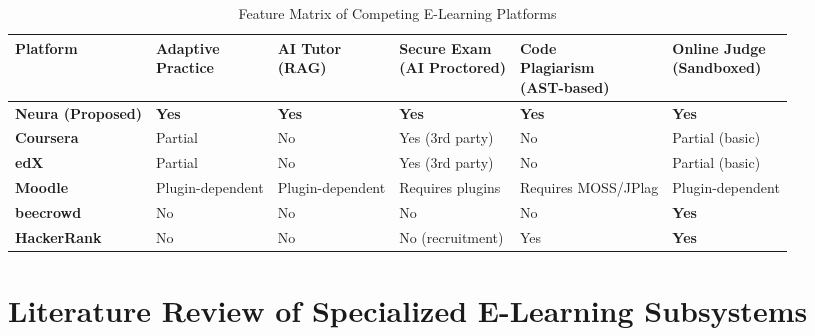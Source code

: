 \begin{table}[h]
    \centering
    \caption{Feature Matrix of Competing E-Learning Platforms}
    \label{tab:feature_matrix}
    \footnotesize
    \setlength{\tabcolsep}{6pt} %
    \begin{tabularx}{\textwidth}{@{}>{\raggedright\arraybackslash}m{2.6cm}
                                   *{5}{>{\centering\arraybackslash}X}@{}}
        \toprule
        \textbf{Platform} &
        \makecell{\textbf{Adaptive}\\\textbf{Practice}} &
        \makecell{\textbf{AI Tutor}\\\textbf{(RAG)}} &
        \makecell{\textbf{Secure Exam}\\\textbf{(AI Proctored)}} &
        \makecell{\textbf{Code}\\\textbf{Plagiarism}\\\textbf{(AST-based)}} &
        \makecell{\textbf{Online Judge}\\\textbf{(Sandboxed)}} \\
        \midrule
        \textbf{Neura (Proposed)} & \textbf{Yes} & \textbf{Yes} & \textbf{Yes} & \textbf{Yes} & \textbf{Yes} \\
        \midrule
        \textbf{Coursera}\footnotemark[1] & Partial & No & Yes (3rd party) & No & Partial (basic) \\
        \midrule
        \textbf{edX}\footnotemark[1] & Partial & No & Yes (3rd party) & No & Partial (basic) \\
        \midrule
        \textbf{Moodle}\footnotemark[2] & Plugin-dependent & Plugin-dependent & Requires plugins & Requires MOSS/JPlag & Plugin-dependent \\
        \midrule
        \textbf{beecrowd}\footnotemark[3] & No & No & No & No & \textbf{Yes} \\
        \midrule
        \textbf{HackerRank} & No & No & No (recruitment) & Yes & \textbf{Yes} \\
        \bottomrule
    \end{tabularx}

\end{table}




\section{Literature Review of Specialized E-Learning Subsystems}

